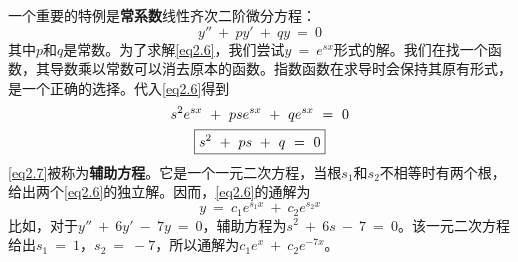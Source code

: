 \documentclass[12pt,a4paper,openany]{ctexbook}
\begin{document}
\begin{flushleft}
一个重要的特例是\textbf{常系数}线性齐次二阶微分方程：
\begin{equation}
    y''\ +\ py'\ +\ qy\ =\ 0
    \label{eq2.6}
\end{equation}
其中$p$和$q$是常数。为了求解\eqref{eq2.6}，我们尝试$y\ =\ e^{sx}$形式的解。我们在找一个函数，其导数乘以常数可以消去原本的函数。指数函数在求导时会保持其原有形式，是一个正确的选择。代入\eqref{eq2.6}得到
\begin{gather}
    s^2e^{sx}\ +\ pse^{sx}\ +\ qe^{sx}\ =\ 0 \notag \\
    \boxed{s^2\ +\ ps\ +\ q\ =\ 0}
    \label{eq2.7}
\end{gather}
\eqref{eq2.7}被称为\textbf{辅助方程}。它是一个一元二次方程，当根$s_1$和$s_2$不相等时有两个根，给出两个\eqref{eq2.6}的独立解。因而，\eqref{eq2.6}的通解为
\begin{equation}
    \boxed{y\ =\ c_1e^{s_1x}\ +\ c_2e^{s_2x}}
    \label{eq2.8}
\end{equation}
比如，对于$y''\ +\ 6y'\ -\ 7y\ =\ 0$，辅助方程为$s^2\ +\ 6s\ -\ 7\ =\ 0$。该一元二次方程给出$s_1\ =\ 1$，$s_2\ =\ -7$，所以通解为$c_1e^x\ +\ c_2e^{-7x}$。
\end{flushleft}
\end{document}
